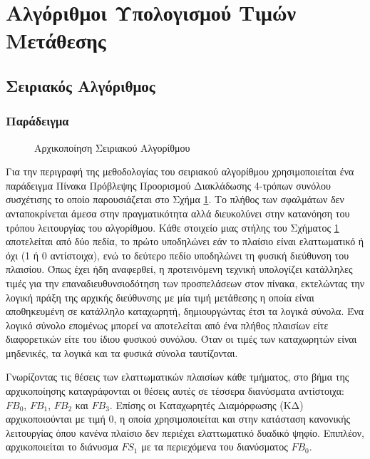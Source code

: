 
\section{Αλγόριθμοι Υπολογισμού Τιμών Μετάθεσης}
\label{chap5_Algorithms}


\subsection{Σειριακός Αλγόριθμος}
\label{chap5_SerialAlgorithm}



\subsubsection*{Παράδειγμα}

\begin{figure}[t]
    \centering
    \caption{Αρχικοποίηση Σειριακού Αλγορίθμου}
    \label{fig:chap5_serial_init}
\end{figure}

Για την περιγραφή της μεθοδολογίας του σειριακού αλγορίθμου χρησιμοποιείται ένα παράδειγμα Πίνακα Πρόβλεψης Προορισμού Διακλάδωσης 4-τρόπων συνόλου συσχέτισης το οποίο παρουσιάζεται στο Σχήμα \ref{fig:chap5_serial_init}. Το πλήθος των σφαλμάτων δεν ανταποκρίνεται άμεσα στην πραγματικότητα αλλά διευκολύνει στην κατανόηση του τρόπου λειτουργίας του αλγορίθμου. Κάθε στοιχείο μιας στήλης του Σχήματος \ref{fig:chap5_serial_init} αποτελείται από δύο πεδία, το πρώτο υποδηλώνει εάν το πλαίσιο είναι ελαττωματικό ή όχι (1 ή 0 αντίστοιχα), ενώ το δεύτερο πεδίο υποδηλώνει τη φυσική διεύθυνση του πλαισίου. Όπως έχει ήδη αναφερθεί, η προτεινόμενη τεχνική υπολογίζει κατάλληλες τιμές για την επαναδιευθυνσιοδότηση των προσπελάσεων στον πίνακα, εκτελώντας την λογική πράξη \xor της αρχικής διεύθυνσης με μία τιμή μετάθεσης η οποία είναι αποθηκευμένη σε κατάλληλο καταχωρητή, δημιουργώντας έτσι τα λογικά σύνολα. Ένα λογικό σύνολο επομένως μπορεί να αποτελείται από ένα πλήθος πλαισίων είτε διαφορετικών είτε του ίδιου φυσικού συνόλου. Όταν οι τιμές των καταχωρητών είναι μηδενικές, τα λογικά και τα φυσικά σύνολα ταυτίζονται.
\par
Γνωρίζοντας τις θέσεις των ελαττωματικών πλαισίων κάθε τμήματος, στο βήμα της αρχικοποίησης καταγράφονται οι θέσεις αυτές σε τέσσερα διανύσματα αντίστοιχα: $FB_{0}$, $FB_{1}$, $FB_{2}$ και $FB_{3}$. Επίσης οι Καταχωρητές Διαμόρφωσης (ΚΔ) αρχικοποιούνται με τιμή 0, η οποία χρησιμοποιείται και στην κατάσταση κανονικής λειτουργίας όπου κανένα πλαίσιο δεν περιέχει ελαττωματικό δυαδικό ψηφίο. Επιπλέον, αρχικοποιείται το διάνυσμα $FS_{1}$ με τα περιεχόμενα του διανύσματος $FB_{0}$.

